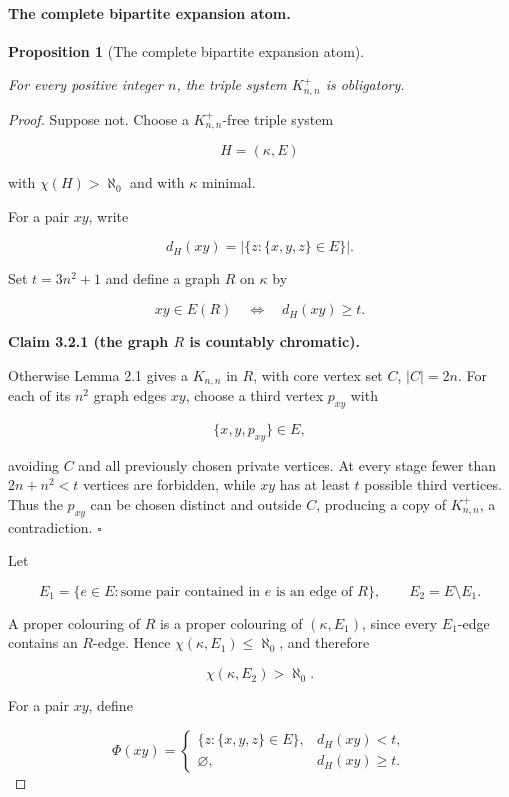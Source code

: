 \documentclass[a4paper,11pt,reqno]{amsart}
\theoremstyle{plain}
\newtheorem{proposition}[theorem]{Proposition}
\theoremstyle{definition}
\theoremstyle{remark}
\begin{document}
\paragraph{The complete bipartite expansion atom.}\label{the-complete-bipartite-expansion-atom}
\begin{proposition}[The complete bipartite expansion atom]\label{proposition-3.2-the-complete-bipartite-expansion-atom}

For every positive integer \(n\), the triple system \(K_{n,n}^{+}\) is obligatory.

\end{proposition}
\begin{proof}
Suppose not. Choose a \(K_{n,n}^{+}\)-free triple system

\[
H=(\kappa,E)
\]

with \(\chi(H)>\aleph_0\) and with \(\kappa\) minimal.

For a pair \(xy\), write

\[
d_H(xy)=|\{z:\{x,y,z\}\in E\}|.
\]

Set \(t=3n^2+1\) and define a graph \(R\) on \(\kappa\) by

\[
xy\in E(R)\quad\Longleftrightarrow\quad d_H(xy)\ge t.
\]

\medskip\noindent\textbf{Claim 3.2.1 (the graph \(R\) is countably chromatic).}

Otherwise Lemma 2.1 gives a \(K_{n,n}\) in \(R\), with core vertex set \(C\), \(|C|=2n\). For each of its \(n^2\) graph edges \(xy\), choose a third vertex \(p_{xy}\) with

\[
\{x,y,p_{xy}\}\in E,
\]

avoiding \(C\) and all previously chosen private vertices. At every stage fewer than \(2n+n^2<t\) vertices are forbidden, while \(xy\) has at least \(t\) possible third vertices. Thus the \(p_{xy}\) can be chosen distinct and outside \(C\), producing a copy of \(K_{n,n}^{+}\), a contradiction. \(\square\)

Let

\[
E_1=\{e\in E:\text{some pair contained in }e\text{ is an edge of }R\},
\qquad E_2=E\setminus E_1.
\]

A proper colouring of \(R\) is a proper colouring of \((\kappa,E_1)\), since every \(E_1\)-edge contains an \(R\)-edge. Hence \(\chi(\kappa,E_1)\le\aleph_0\), and therefore

\[
\chi(\kappa,E_2)>\aleph_0. \tag{3.1}
\]

For a pair \(xy\), define

\[
\Phi(xy)=
\begin{cases}
\{z:\{x,y,z\}\in E\},&d_H(xy)<t,\\
\varnothing,&d_H(xy)\ge t.
\end{cases}
\]


\end{proof}
\end{document}
